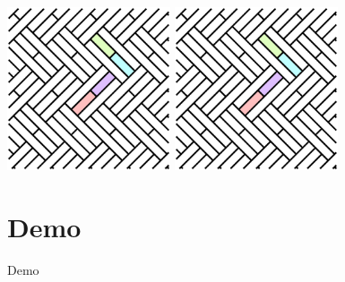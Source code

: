\documentclass{beamer}
\begin{document}
\begin{frame}
  \begin{center}
    \includegraphics[width=1.9in]{c12}
    \includegraphics[width=1.9in]{c12}
  \end{center}
\end{frame}


\section{Demo}

\begin{frame}
  \begin{center}
    Demo
  \end{center}
\end{frame}
\end{document}
